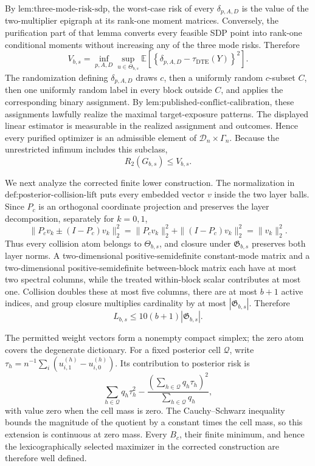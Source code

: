 By \(\text{lem:three-mode-risk-sdp}\), the worst-case risk of every \(\delta_{p,A,D}\) is the value of the two-multiplier epigraph at its rank-one moment matrices. Conversely, the purification part of that lemma converts every feasible SDP point into rank-one conditional moments without increasing any of the three mode risks. Therefore
\[
V_{b,s}=\inf_{p,A,D}\sup_{u\in\Theta_{b,s}}
\mathbb E\!\left[\left\{\delta_{p,A,D}-\tau_{\mathrm{DTE}}(Y)\right\}^2\right].
\]
The randomization defining \(\delta_{p,A,D}\) draws \(c\), then a uniformly random \(c\)-subset \(C\), then one uniformly random label in every block outside \(C\), and applies the corresponding binary assignment. By \(\text{lem:published-conflict-calibration}\), these assignments lawfully realize the maximal target-exposure patterns. The displayed linear estimator is measurable in the realized assignment and outcomes. Hence every purified optimizer is an admissible element of \(\mathcal D_n\times\Gamma_n\). Because the unrestricted infimum includes this subclass,
\[
R_2(G_{b,s})\le V_{b,s}.
\]

We next analyze the corrected finite lower construction. The normalization in \(\text{def:posterior-collision-lift}\) puts every embedded vector \(v\) inside the two layer balls. Since \(P_c\) is an orthogonal coordinate projection and preserves the layer decomposition, separately for \(k=0,1\),
\[
\|P_cv_k\pm(I-P_c)v_k\|_2^2
=\|P_cv_k\|_2^2+\|(I-P_c)v_k\|_2^2
=\|v_k\|_2^2.
\]
Thus every collision atom belongs to \(\Theta_{b,s}\), and closure under \(\mathfrak G_{b,s}\) preserves both layer norms. A two-dimensional positive-semidefinite constant-mode matrix and a two-dimensional positive-semidefinite between-block matrix each have at most two spectral columns, while the treated within-block scalar contributes at most one. Collision doubles these at most five columns, there are at most \(b+1\) active indices, and group closure multiplies cardinality by at most \(|\mathfrak G_{b,s}|\). Therefore
\[
L_{b,s}\le10(b+1)|\mathfrak G_{b,s}|.
\]

The permitted weight vectors form a nonempty compact simplex; the zero atom covers the degenerate dictionary. For a fixed posterior cell \(\mathcal Q\), write \(\tau_h=n^{-1}\sum_i(u^{(h)}_{i,1}-u^{(h)}_{i,0})\). Its contribution to posterior risk is
\[
\sum_{h\in\mathcal Q}q_h\tau_h^2
-\frac{\left(\sum_{h\in\mathcal Q}q_h\tau_h\right)^2}
{\sum_{h\in\mathcal Q}q_h},
\]
with value zero when the cell mass is zero. The Cauchy--Schwarz inequality bounds the magnitude of the quotient by a constant times the cell mass, so this extension is continuous at zero mass. Every \(B_c\), their finite minimum, and hence the lexicographically selected maximizer in the corrected construction are therefore well defined.

